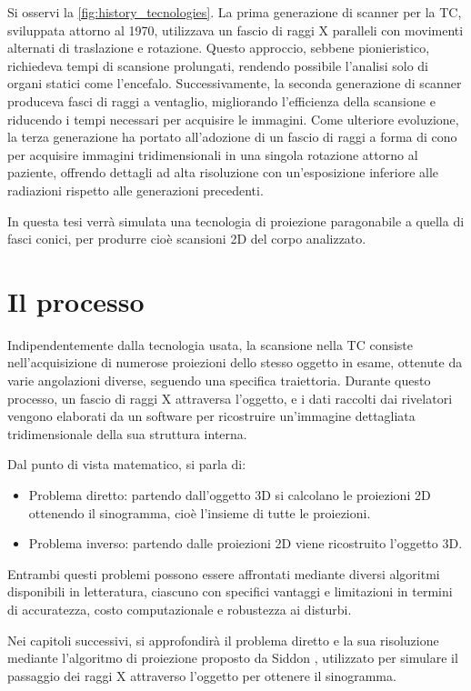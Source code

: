 \documentclass[12pt,a4paper]{report}
\begin{document}
Si osservi la \autoref{fig:history_tecnologies}.
La prima generazione di scanner per la TC, sviluppata attorno al 1970, utilizzava un fascio di raggi X paralleli con movimenti
alternati di traslazione e rotazione.
Questo approccio, sebbene pionieristico, richiedeva tempi di scansione prolungati, rendendo possibile l'analisi solo di organi
statici come l'encefalo.
Successivamente, la seconda generazione di scanner produceva fasci di raggi a ventaglio, migliorando l'efficienza della
scansione e riducendo i tempi necessari per acquisire le immagini.
Come ulteriore evoluzione, la terza generazione ha portato all'adozione di un fascio di raggi a forma di cono per acquisire
immagini tridimensionali in una singola rotazione attorno al paziente, offrendo dettagli ad alta risoluzione con un'esposizione
inferiore alle radiazioni rispetto alle generazioni precedenti.

In questa tesi verrà simulata una tecnologia di proiezione paragonabile a quella di fasci conici, per produrre cioè scansioni 2D
del corpo analizzato.

\section{Il processo}

Indipendentemente dalla tecnologia usata, la scansione nella TC consiste nell'acquisizione di numerose proiezioni dello stesso
oggetto in esame, ottenute da varie angolazioni diverse, seguendo una specifica traiettoria.
Durante questo processo, un fascio di raggi X attraversa l'oggetto, e i dati raccolti dai rivelatori vengono elaborati da un
software per ricostruire un'immagine dettagliata tridimensionale della sua struttura interna.

Dal punto di vista matematico, si parla di:
\begin{itemize}
  \item Problema diretto: partendo dall'oggetto 3D si calcolano le proiezioni 2D ottenendo il sinogramma, cioè l'insieme di tutte
        le proiezioni.
  \item Problema inverso: partendo dalle proiezioni 2D viene ricostruito l'oggetto 3D.
\end{itemize}

Entrambi questi problemi possono essere affrontati mediante diversi algoritmi disponibili in letteratura, ciascuno con specifici
vantaggi e limitazioni in termini di accuratezza, costo computazionale e robustezza ai disturbi.

Nei capitoli successivi, si approfondirà il problema diretto e la sua risoluzione mediante l'algoritmo di proiezione proposto da
Siddon \cite{Siddon1984}, utilizzato per simulare il passaggio dei raggi X attraverso l'oggetto per ottenere il sinogramma.
\end{document}

